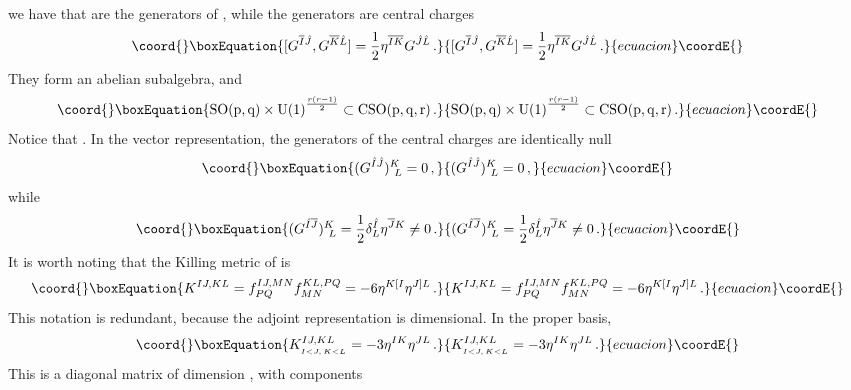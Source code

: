 \documentclass[a4paper,12pt]{article}
\def\bar{\overline}\end {picture}}
\begin{document}
we have that \myHighlight{$G^{\bar{I}\bar{J}}$}\coordHE{} are the generators of
\coordHE{} , while the
\coordHE{} generators \coordHE{} are central charges
\begin{equation}\coord{}\boxEquation{
[G^{\bar{I}\hat{J}},G^{\bar{K}\hat{L}}]={1\over
2}\eta^{\bar{I}\bar{K}} G^{\hat{J}\hat{L}}\,. \label{nonnull}
}{
[G^{\bar{I}\hat{J}},G^{\bar{K}\hat{L}}]={1\over
2}\eta^{\bar{I}\bar{K}} G^{\hat{J}\hat{L}}\,. }{ecuacion}\coordE{}\end{equation}
They form an abelian subalgebra, and
\begin{equation}\coord{}\boxEquation{
\mathrm{SO(p,q)}\times \mathrm{U(1)}^{r\left(r-1\right)\over
2}\subset \mathrm{CSO(p,q,r)}\,.
}{
\mathrm{SO(p,q)}\times \mathrm{U(1)}^{r\left(r-1\right)\over
2}\subset \mathrm{CSO(p,q,r)}\,.
}{ecuacion}\coordE{}\end{equation}
Notice that \coordHE{}. In
the vector representation, the generators of the central charges
are identically null
\begin{equation}\coord{}\boxEquation{
(G^{\hat{I}\hat{J}})^K_{~L}=0\,, \label{zerogen}
}{
(G^{\hat{I}\hat{J}})^K_{~L}=0\,, }{ecuacion}\coordE{}\end{equation}
while
\begin{equation}\coord{}\boxEquation{
(G^{\hat{I}\bar{J}})^K_{~L}={1\over
2}\delta^{\hat{I}}_L\eta^{\bar{J}K}\neq 0\,.
}{
(G^{\hat{I}\bar{J}})^K_{~L}={1\over
2}\delta^{\hat{I}}_L\eta^{\bar{J}K}\neq 0\,.
}{ecuacion}\coordE{}\end{equation}
It is worth noting that the Killing metric of \coordHE{}
is
\begin{equation}\coord{}\boxEquation{
K^{IJ,KL}=f^{IJ,MN}_{PQ}f^{KL,PQ}_{MN}=-6\eta^{K[I}\eta^{J]L}\,.
}{
K^{IJ,KL}=f^{IJ,MN}_{PQ}f^{KL,PQ}_{MN}=-6\eta^{K[I}\eta^{J]L}\,.
}{ecuacion}\coordE{}\end{equation}
This notation is redundant, because the adjoint representation is
\coordHE{} dimensional. In the proper basis,
\begin{equation}\coord{}\boxEquation{
K^{IJ,KL}_{_{I<J,\,K<L}}=-3\eta^{IK}\eta^{JL}\,.
}{
K^{IJ,KL}_{_{I<J,\,K<L}}=-3\eta^{IK}\eta^{JL}\,.
}{ecuacion}\coordE{}\end{equation}
This is a diagonal matrix of dimension \coordHE{}, with components
\end{document}

